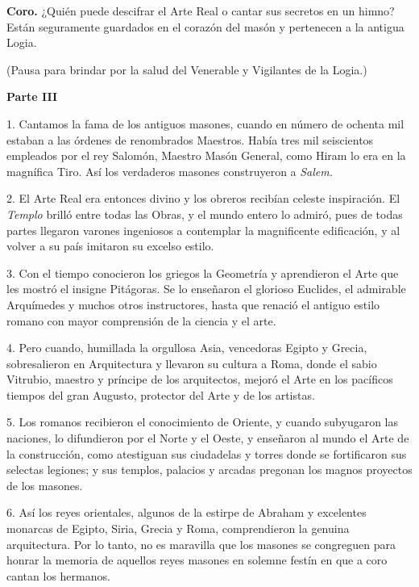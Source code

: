\documentclass[a4paper,12pt,twoside]{book}
\begin{document}
\noindent \textbf{Coro.} ¿Quién puede descifrar el Arte Real o cantar sus secretos en un himno? Están seguramente guardados en el corazón del masón y pertenecen a la antigua Logia.

\noindent (Pausa para brindar por la salud del Venerable y Vigilantes de la Logia.)

\vspace{0.5cm}

\noindent \textbf{Parte III}

1. Cantamos la fama de los antiguos masones, cuando en número de ochenta mil estaban a las órdenes de renombrados Maestros. Había tres mil seiscientos empleados por el rey Salomón, Maestro Masón General, como Hiram lo era en la magnífica Tiro. Así los verdaderos masones construyeron a \textit{Salem.}

2. El Arte Real era entonces divino y los obreros recibían celeste inspiración. El \textit{Templo} brilló entre todas las Obras, y el mundo entero lo admiró, pues de todas partes llegaron varones ingeniosos a contemplar la magnificente edificación, y al volver a su país imitaron su excelso estilo.

3. Con el tiempo conocieron los griegos la Geometría y aprendieron el Arte que les mostró el insigne Pitágoras. Se lo enseñaron el glorioso Euclides, el admirable Arquímedes y muchos otros instructores, hasta que renació el antiguo estilo romano con mayor comprensión de la ciencia y el arte.

4. Pero cuando, humillada la orgullosa Asia, vencedoras Egipto y Grecia, sobresalieron en Arquitectura y llevaron su cultura a Roma, donde el sabio Vitrubio, maestro y príncipe de los arquitectos, mejoró el Arte en los pacíficos tiempos del gran Augusto, protector del Arte y de los artistas.

5. Los romanos recibieron el conocimiento de Oriente, y cuando subyugaron las naciones, lo difundieron por el Norte y el Oeste, y enseñaron al mundo el Arte de la construcción, como atestiguan sus ciudadelas y torres donde se fortificaron sus selectas legiones; y sus templos, palacios y arcadas pregonan los magnos proyectos de los masones.

6. Así los reyes orientales, algunos de la estirpe de Abraham y excelentes monarcas de Egipto, Siria, Grecia y Roma, comprendieron la genuina arquitectura. Por lo tanto, no es maravilla que los masones se congreguen para honrar la memoria de aquellos reyes masones en solemne festín en que a coro cantan los hermanos.
\end{document}

